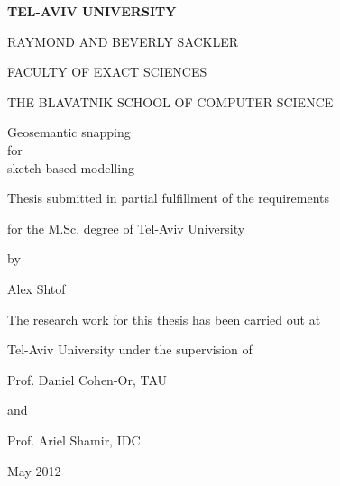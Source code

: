 %
%

\begin{center}

\thispagestyle{empty}


\large\textbf{TEL-AVIV UNIVERSITY}

\large{RAYMOND AND BEVERLY SACKLER}

\large{FACULTY OF EXACT SCIENCES}

\large{THE BLAVATNIK SCHOOL OF COMPUTER SCIENCE}

\titlespace

\titlespace

\Huge{Geosemantic snapping}\\
\linespread{1.3} \LARGE{for}\\
\linespread{1.1}\Huge{sketch-based modelling}\linespread{1.4}

\titlespace

\titlespace

\titlespace

\large{Thesis submitted in partial fulfillment of the
requirements}

\large{for the M.Sc. degree of Tel-Aviv University}

\large{by}

\large{Alex Shtof}

\titlespace

\titlespace

\large{The research work for this thesis has been carried out at}

\large{Tel-Aviv University under the supervision of}

\titlespace

\large{Prof. Daniel Cohen-Or, TAU}

\large{and}

\large{Prof. Ariel Shamir, IDC}

\titlespace

\titlespace

\titlespace

\large{May 2012}

\end{center}

\cleardoublepage
